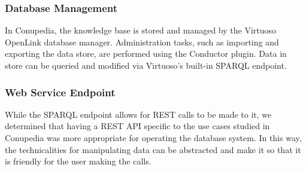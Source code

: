 \documentclass[conference]{IEEEtran}
\begin{document}
        \subsubsection{Database Management}
            In Conupedia, the knowledge base is stored and managed by the Virtuoso OpenLink database manager.
            Administration tasks, such as importing and exporting the data store, are performed using the Conductor plugin.
            Data in store can be queried and modified via Virtuoso's built-in SPARQL endpoint.\\
            
            
        \subsubsection{Web Service Endpoint}
            While the SPARQL endpoint allows for REST calls to be made to it, we determined that having a REST API specific to the use cases studied in Conupedia was more appropriate for operating the database system. 
            In this way, the technicalities for manipulating data can be abstracted and make it so that it is friendly for the user making the calls.
            
\end{document}
